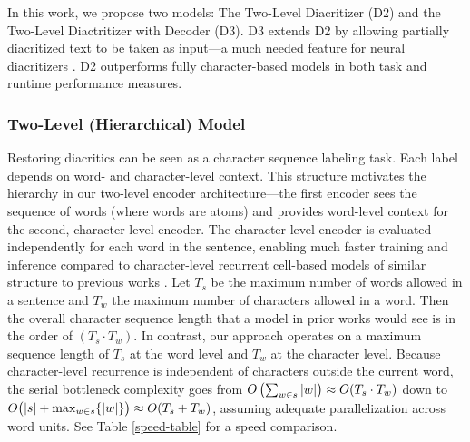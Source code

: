 \documentclass[11pt]{article}
\DeclarePairedDelimiter\abs{\lvert}{\rvert}\DeclarePairedDelimiter\norm{\lVert}{\rVert}
\begin{document}
In this work, we propose two models: The Two-Level Diacritizer (D2) and the Two-Level Diactritizer with Decoder (D3). D3 extends D2 by allowing partially diacritized text to be taken as input---a much needed feature for neural diacritizers \cite{fadel19}. D2 outperforms fully character-based models in both task and runtime performance measures.
\subsubsection{Two-Level (Hierarchical) Model}
\label{arch:hie}
Restoring diacritics can be seen as a character sequence labeling task. Each label depends on word- and character-level context. This structure motivates the hierarchy in our two-level encoder architecture---the first encoder sees the sequence of words (where words are atoms) and provides word-level context for the second, character-level encoder. The character-level encoder is evaluated independently for each word in the sentence, enabling much faster training and inference compared to character-level recurrent cell-based models of similar structure to previous works \cite{belinkov-glass-2015-arabic,mubarak19-highly,joint2020,fadel19-neural}. Let $T_s$ be the maximum number of words allowed in a sentence and $T_w$ the maximum number of characters allowed in a word. Then the overall character sequence length that a model in prior works would see is in the order of $(T_s \cdot T_w)$. In contrast, our approach operates on a maximum sequence length of $T_s$ at the word level and $T_w$ at the character level. Because character-level recurrence is independent of characters outside the current word, the serial bottleneck complexity goes from $O\left(\sum_{w \in s}{\abs{w}}\right) \approx O(T_s \cdot T_w)$ down to $O\bigl(\abs{s} + \max_{w \in s}\{\abs{w}\}\bigr) \approx O(T_s + T_w)$, assuming adequate parallelization across word units. See Table \ref{speed-table} for a speed comparison.
\end{document}

